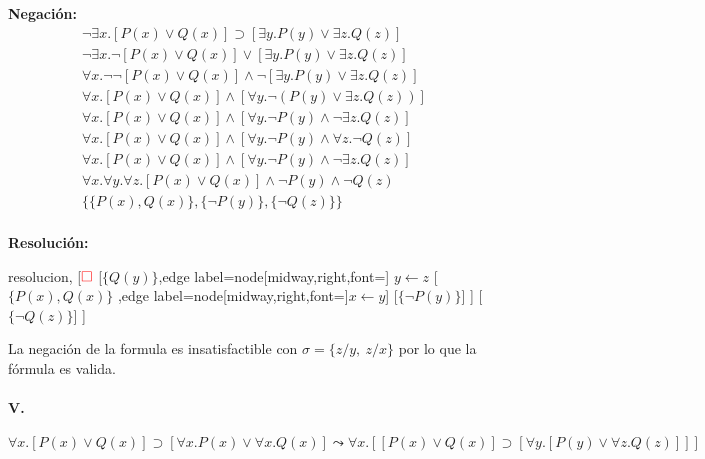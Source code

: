 \documentclass[10pt,a4paper]{article}
\begin{document}
\begin{multicols}{2}
\textbf{Negación:}
\begin{align*}
\lnot\exists x.[P(x) \lor Q(x)] \supset [\exists y.P(y) \lor \exists z.Q(z)] & \\[1pt]
\lnot\exists x.\lnot [P(x) \lor Q(x)] \lor [\exists y.P(y) \lor \exists z.Q(z)] & \\[1pt]
\forall x.\lnot\lnot [P(x) \lor Q(x)] \land \lnot[\exists y.P(y) \lor \exists z.Q(z)] & \\[1pt]
\forall x.[P(x) \lor Q(x)] \land [\forall y.\lnot(P(y) \lor \exists z.Q(z))] & \\[1pt]
\forall x.[P(x) \lor Q(x)] \land [\forall y.\lnot P(y) \land \lnot\exists z.Q(z)] & \\[1pt]
\forall x.[P(x) \lor Q(x)] \land [\forall y.\lnot P(y) \land \forall z.\lnot Q(z)] & \\[1pt]
\forall x.[P(x) \lor Q(x)] \land [\forall y.\lnot P(y) \land \lnot\exists z.Q(z)] & \\[1pt]
\forall x.\forall y.\forall z.[P(x) \lor Q(x)] \land \lnot P(y) \land \lnot Q(z) & \\[1pt]
\{\{P(x),Q(x)\}, \{\lnot P(y)\}, \{\lnot Q(z)\}\}  \\[1pt]
\end{align*}

\textbf{Resolución:}
\begin{center}
	\begin{forest} resolucion,
[${\color{red}\Box}$ 
	[$\{Q(y)\}$,edge label={node[midway,right,font=\footnotesize] {$y\leftarrow z$}}
	    [$\{P(x) \comma Q(x)\}$
	    ,edge label={node[midway,right,font=\footnotesize]{$x\leftarrow y$}}]
	    [$\{\lnot P(y)\}$]
	]
	[$\{\lnot Q(z)\}$]
]
	\end{forest}
\end{center}
La negación de la formula es insatisfactible con $\sigma = \{ z/y,~z/x\}$ por lo que la fórmula es valida.
\end{multicols}

\paragraph{V.}$ \forall x. [P(x) \lor Q(x)] \supset [\forall x. P(x) \lor \forall x. Q(x)] \leadsto \forall x. [[P(x) \lor Q(x)] \supset [\forall y. [P(y) \lor \forall z. Q(z)]]]$
\end{document}
